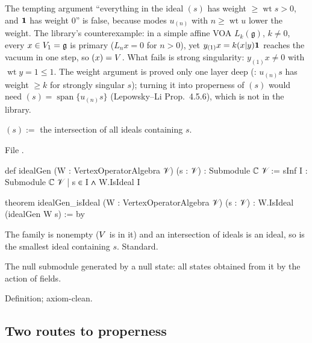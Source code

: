 \begin{warning}[title={Trap / dead end: Virasoro singularity alone does not make the generated ideal proper}]\label{l04:warn:primary}
The tempting argument ``everything in the ideal $(s)$ has weight $\ge\operatorname{wt}s>0$, and
$\mathbf{1}$ has weight $0$'' is false, because modes $u_{(n)}$ with $n\ge\operatorname{wt}u$ lower the
weight. The library's counterexample: in a simple affine VOA $L_k(\mathfrak g)$, $k\ne0$, every
$x\in V_1 = \mathfrak g$ is primary ($L_nx = 0$ for $n>0$), yet $y_{(1)}x = k(x|y)\mathbf{1}$ reaches the
vacuum in one step, so $(x) = V$. What fails is strong singularity: $y_{(1)}x\ne0$ with
$\operatorname{wt}y = 1\le1$. The weight argument is proved only one layer deep
(: $u_{(n)}s$ has weight $\ge k$ for strongly singular $s$); turning it into
properness of $(s)$ would need $(s) = \operatorname{span}\{u_{(n)}s\}$ (Lepowsky--Li Prop.~4.5.6),
which is not in the library.
\end{warning}

\begin{definition}\label{l04:def:idealgen}
$(s) :=$ the intersection of all ideals containing $s$.
\end{definition}
\noindent File .
\begin{leancode}
def idealGen (W : VertexOperatorAlgebra 𝒱) (s : 𝒱) : Submodule ℂ 𝒱 :=
  sInf {I : Submodule ℂ 𝒱 | s ∈ I ∧ W.IsIdeal I}

theorem idealGen_isIdeal (W : VertexOperatorAlgebra 𝒱) (s : 𝒱) : W.IsIdeal (idealGen W s) := by
\end{leancode}
\begin{dictionary}
The family is nonempty ($V$ is in it) and an intersection of ideals is an ideal, so 
is the smallest ideal containing $s$. Standard.
\end{dictionary}
\begin{physics}
The null submodule generated by a null state: all states obtained from it by the action of fields.
\end{physics}
\begin{status}
Definition; axiom-clean.
\end{status}

\subsection{Two routes to properness}

